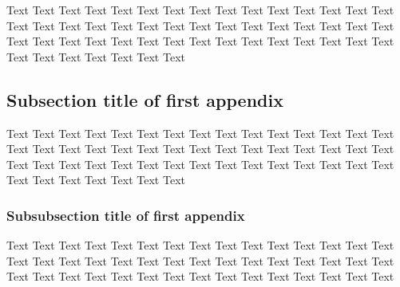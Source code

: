 \documentclass{sysbio}%
\begin{document}
Text Text Text Text Text Text Text Text Text Text Text Text Text Text Text Text Text Text Text Text Text Text Text Text Text Text Text Text Text Text Text Text Text Text Text Text Text Text Text Text Text Text Text Text Text Text Text Text Text Text Text Text

\subsection{Subsection title of first appendix}\label{appsec2}

Text Text Text Text Text Text Text Text Text Text Text Text Text Text Text Text Text Text Text Text Text Text Text Text Text Text Text Text Text Text Text Text Text Text Text Text Text Text Text Text Text Text Text Text Text Text Text Text Text Text Text Text

\subsubsection{Subsubsection title of first appendix}\label{appsec3}

Text Text Text Text Text Text Text Text Text Text Text Text Text Text Text Text Text Text Text Text Text Text Text Text Text Text Text Text Text Text Text Text Text Text Text Text Text Text Text Text Text Text Text Text Text%


\end{document}
